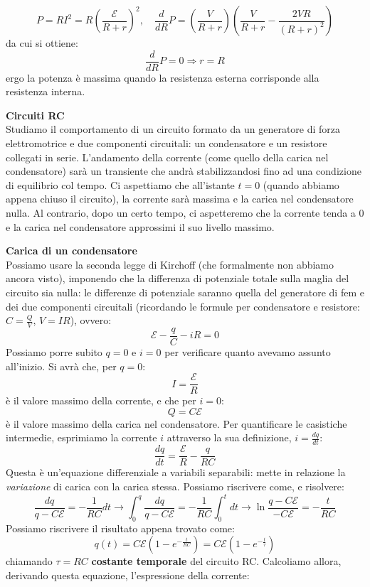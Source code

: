 \documentclass[a4paper,12pt]{article}
\begin{document}
$$ P = RI^2 = R \left(\frac{\mathcal{E}}{R + r}\right)^2, \quad \frac{d}{dR}P = \left( \frac{V}{R+r} \right) \left( \frac{V}{R+r} - \frac{2VR}{(R+r)^2} \right)$$
da cui si ottiene:
$$ \frac{d}{dR}P = 0 \Rightarrow r = R$$
ergo la potenza è massima quando la resistenza esterna corrisponde alla resistenza interna.
\par\smallskip
\textbf{Circuiti RC} \\
Studiamo il comportamento di un circuito formato da un generatore di forza elettromotrice e due componenti circuitali:
un condensatore e un resistore collegati in serie. L'andamento della corrente (come quello della carica nel condensatore) sarà
un transiente che andrà stabilizzandosi fino ad una condizione di equilibrio col tempo. Ci aspettiamo che all'istante $t=0$ (quando abbiamo appena
chiuso il circuito), la corrente sarà massima e la carica nel condensatore nulla. Al contrario, dopo un certo tempo, ci aspetteremo che la corrente
tenda a 0 e la carica nel condensatore approssimi il suo livello massimo. 
\par\smallskip
\textbf{Carica di un condensatore} \\
Possiamo usare la seconda legge di Kirchoff (che formalmente non abbiamo ancora visto),
imponendo che la differenza di potenziale totale sulla maglia del circuito sia nulla: le differenze di potenziale saranno quella del generatore di fem e dei due componenti
circuitali (ricordando le formule per condensatore e resistore: $C = \frac{Q}{V}$, $V = IR$), ovvero:
$$ \mathcal{E} - \frac{q}{C} - iR = 0$$
Possiamo porre subito $q = 0$ e $i = 0$ per verificare quanto avevamo assunto all'inizio. Si avrà che, per $q = 0$:
$$ I = \frac{\mathcal{E}}{R} $$
è il valore massimo della corrente, e che per $i = 0$:
$$ Q = C\mathcal{E} $$
è il valore massimo della carica nel condensatore.
Per quantificare le casistiche intermedie, esprimiamo la corrente $i$ attraverso la sua definizione, $i = \frac{dq}{dt}$:
$$ \frac{dq}{dt} = \frac{\mathcal{E}}{R} - \frac{q}{RC} $$
Questa è un'equazione differenziale a variabili separabili: mette in relazione la \textit{variazione} di carica con la carica stessa. Possiamo riscrivere come, e risolvere:
$$ \frac{dq}{q - C\mathcal{E}} = -\frac{1}{RC}dt \rightarrow \int_0^q \frac{dq}{q - C\mathcal{E}} = -\frac{1}{RC}\int_0^t dt \rightarrow \ln{\frac{q-C\mathcal{E}}{-C\mathcal{E}}} = -\frac{t}{RC}  $$
Possiamo riscrivere il risultato appena trovato come:
$$ q(t) = C\mathcal{E}\left(1 - e^{-\frac{t}{RC}}\right) = C\mathcal{E}\left(1 - e^{-\frac{t}{\tau}}\right)$$
chiamando $\tau = RC$ \textbf{costante temporale} del circuito RC. Calcoliamo allora, derivando questa equazione, l'espressione della corrente:
\end{document}
